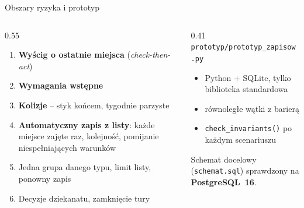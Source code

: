 \documentclass[aspectratio=169,11pt]{beamer}
\begin{document}
\begin{frame}{Obszary ryzyka i prototyp}
  \begin{columns}[T]
    \begin{column}{0.55\textwidth}
      \small
      \begin{enumerate}
        \item \textbf{Wyścig o ostatnie miejsca} (\emph{check-then-act})
        \item \textbf{Wymagania wstępne}
        \item \textbf{Kolizje} -- styk końcem, tygodnie parzyste
        \item \textbf{Automatyczny zapis z listy}: każde miejsce zajęte raz, kolejność, pomijanie niespełniających warunków
        \item Jedna grupa danego typu, limit listy, ponowny zapis
        \item Decyzje dziekanatu, zamknięcie tury
      \end{enumerate}
    \end{column}
    \begin{column}{0.41\textwidth}
      \small
      \texttt{prototyp/prototyp\_zapisow.py}
      \begin{itemize}
        \item Python + SQLite, tylko biblioteka standardowa
        \item równoległe wątki z barierą
        \item \texttt{check\_invariants()} po każdym scenariuszu
      \end{itemize}
      Schemat docelowy (\texttt{schemat.sql}) sprawdzony na \textbf{PostgreSQL~16}.
    \end{column}
  \end{columns}
\end{frame}
\end{document}
